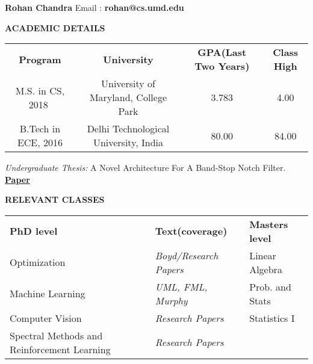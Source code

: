 \documentclass[a4paper,8pt]{article}
\newcommand{\resheading}[1]{\begin{tcolorbox} \begin{center} #1 \end{center} \end{tcolorbox}}
\begin{document}

\textbf{\large{Rohan Chandra}} 
\indent Email : \textbf{rohan@cs.umd.edu} \\

\resheading{\textbf{ACADEMIC DETAILS} }
\indent \begin{tabular}{ c @{\hskip 0.40in} c @{\hskip 0.50in} c @{\hskip 0.50in} c @{\hskip 0.40in} }
\textbf{Program} & \multicolumn{1}{c}{\textbf{University}}  & \textbf{GPA(\small{Last Two Years})} & \textbf{Class High}\\
M.S. in CS, 2018\,\, & \multicolumn{1}{c}{University of Maryland, College Park} & {3.783} & {4.00}\\
B.Tech in ECE, 2016 & \multicolumn{1}{c}{Delhi Technological University, India} & {80.00} & {84.00}\\
\end{tabular}
\newline
\textit{Undergraduate Thesis:} A Novel Architecture For A Band-Stop Notch Filter. \href{http://search.proquest.com/openview/324892b65f61b2bd4cee1526c67b0ef8/1?pq-origsite=gscholar&cbl=2030624}{\textbf{Paper}}


\resheading{\textbf{RELEVANT CLASSES} }
\indent \begin{tabular}{ l @{\hskip 0.70in} l @{\hskip 0.70in} l @{\hskip 0.70in}  }
\textbf{PhD level} & \textbf{Text(coverage)} & \textbf{Masters level}   \\
Optimization & \textit{Boyd/Research Papers} & Linear Algebra  \\
Machine Learning & \textit{UML, FML, Murphy} & Prob. and Stats  \\
Computer Vision & \textit{Research Papers} &  Statistics I\\
Spectral Methods and Reinforcement Learning & \textit{Research Papers}
\end{tabular}
\end{document}
